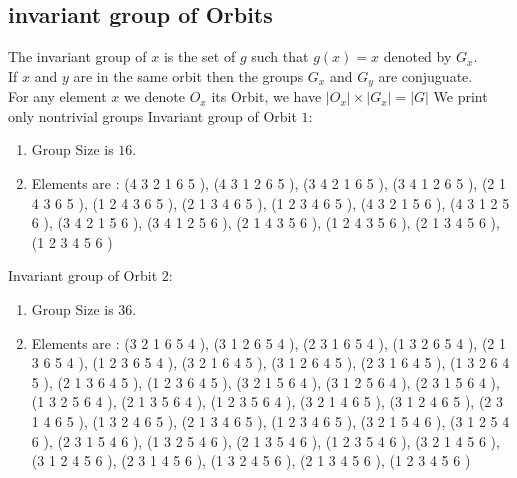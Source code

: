 \documentclass[12pt]{article}
\begin{document}
\subsection{invariant group of Orbits}
\noindent The invariant group of $x$ is the set of $g$ such that $g(x)=x$ denoted by $G_x$.\\
If $x$ and $y$ are in the same orbit then the groups $G_x$ and  $G_y$ are conjuguate.\\
For any element $x$ we denote $O_x$ its Orbit, we have $|O_x|\times |G_x|=|G|$
We print only nontrivial groups
Invariant group of Orbit $1$:
\begin{enumerate}
\item Group Size is $16$.
\item Elements are : (4 3 2 1 6 5  ), (4 3 1 2 6 5  ), (3 4 2 1 6 5  ), (3 4 1 2 6 5  ), (2 1 4 3 6 5  ), (1 2 4 3 6 5  ), (2 1 3 4 6 5  ), (1 2 3 4 6 5  ), (4 3 2 1 5 6  ), (4 3 1 2 5 6  ), (3 4 2 1 5 6  ), (3 4 1 2 5 6  ), (2 1 4 3 5 6  ), (1 2 4 3 5 6  ), (2 1 3 4 5 6  ), (1 2 3 4 5 6  )
\end{enumerate}
Invariant group of Orbit $2$:
\begin{enumerate}
\item Group Size is $36$.
\item Elements are : (3 2 1 6 5 4  ), (3 1 2 6 5 4  ), (2 3 1 6 5 4  ), (1 3 2 6 5 4  ), (2 1 3 6 5 4  ), (1 2 3 6 5 4  ), (3 2 1 6 4 5  ), (3 1 2 6 4 5  ), (2 3 1 6 4 5  ), (1 3 2 6 4 5  ), (2 1 3 6 4 5  ), (1 2 3 6 4 5  ), (3 2 1 5 6 4  ), (3 1 2 5 6 4  ), (2 3 1 5 6 4  ), (1 3 2 5 6 4  ), (2 1 3 5 6 4  ), (1 2 3 5 6 4  ), (3 2 1 4 6 5  ), (3 1 2 4 6 5  ), (2 3 1 4 6 5  ), (1 3 2 4 6 5  ), (2 1 3 4 6 5  ), (1 2 3 4 6 5  ), (3 2 1 5 4 6  ), (3 1 2 5 4 6  ), (2 3 1 5 4 6  ), (1 3 2 5 4 6  ), (2 1 3 5 4 6  ), (1 2 3 5 4 6  ), (3 2 1 4 5 6  ), (3 1 2 4 5 6  ), (2 3 1 4 5 6  ), (1 3 2 4 5 6  ), (2 1 3 4 5 6  ), (1 2 3 4 5 6  )
\end{enumerate}
\end{document}
